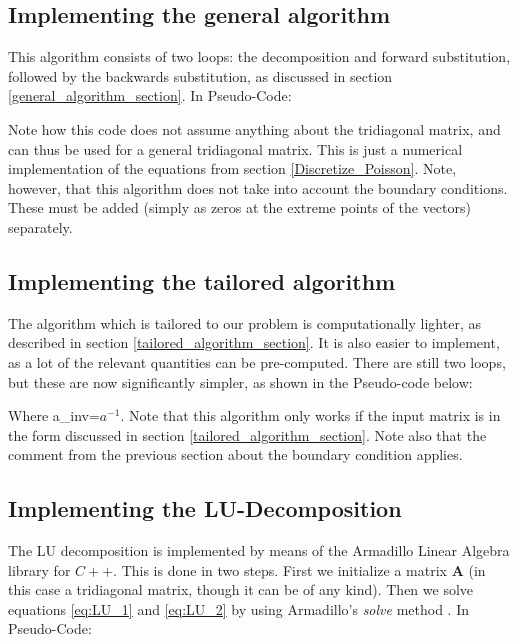 \documentclass[a4paper, 10pt]{article}
\begin{document}
\subsection{Implementing the general algorithm}
This algorithm consists of two loops: the decomposition and forward substitution, followed by the backwards substitution, as discussed in section \ref{general_algorithm_section}. In Pseudo-Code:

Note how this code does not assume anything about the tridiagonal matrix, and can thus be used for a general tridiagonal matrix. This is just a numerical implementation of the equations from section \ref{Discretize_Poisson}. Note, however, that this algorithm does not take into account the boundary conditions. These must be added (simply as zeros at the extreme points of the vectors) separately. 
\subsection{Implementing the tailored algorithm}
The algorithm which is tailored to our problem is computationally lighter, as described in section \ref{tailored_algorithm_section}. It is also easier to implement, as a lot of the relevant quantities can be pre-computed. There are still two loops, but these are now significantly simpler, as shown in the Pseudo-code below:
 
Where a\_inv=$a^{-1}$. Note that this algorithm only works if the input matrix is in the form discussed in section \ref{tailored_algorithm_section}. Note also that the comment from the previous section about the boundary condition applies.
\subsection{Implementing the LU-Decomposition}
The LU decomposition is implemented by means of the Armadillo Linear Algebra library for $C++$. This is done in two steps. First we initialize a matrix $\mathbf{A}$ (in this case a tridiagonal matrix, though it can be of any kind). Then we solve equations \ref{eq:LU_1} and \ref{eq:LU_2} by using Armadillo's \textit{solve} method . In Pseudo-Code:
 
\end{document}
